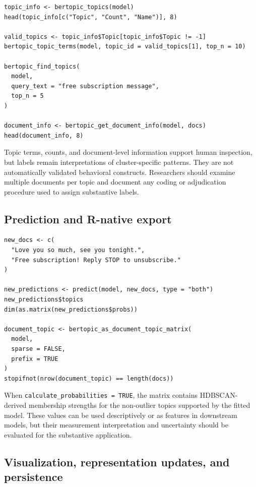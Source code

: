 \documentclass[12pt]{article}
\newcommand{\code}[1]{\texttt{#1}}
\begin{document}
\begin{lstlisting}[caption={Inspecting and querying the fitted topic solution.}]
topic_info <- bertopic_topics(model)
head(topic_info[c("Topic", "Count", "Name")], 8)

valid_topics <- topic_info$Topic[topic_info$Topic != -1]
bertopic_topic_terms(model, topic_id = valid_topics[1], top_n = 10)

bertopic_find_topics(
  model,
  query_text = "free subscription message",
  top_n = 5
)

document_info <- bertopic_get_document_info(model, docs)
head(document_info, 8)
\end{lstlisting}

Topic terms, counts, and document-level information support human inspection, but labels remain interpretations of cluster-specific patterns. They are not automatically validated behavioral constructs. Researchers should examine multiple documents per topic and document any coding or adjudication procedure used to assign substantive labels.

\subsection{Prediction and R-native export}

\begin{lstlisting}[caption={Transforming new documents and exporting training-corpus output.}]
new_docs <- c(
  "Love you so much, see you tonight.",
  "Free subscription! Reply STOP to unsubscribe."
)

new_predictions <- predict(model, new_docs, type = "both")
new_predictions$topics
dim(as.matrix(new_predictions$probs))

document_topic <- bertopic_as_document_topic_matrix(
  model,
  sparse = FALSE,
  prefix = TRUE
)
stopifnot(nrow(document_topic) == length(docs))
\end{lstlisting}

When \code{calculate\_probabilities = TRUE}, the matrix contains HDBSCAN-derived membership strengths for the non-outlier topics supported by the fitted model. These values can be used descriptively or as features in downstream models, but their measurement interpretation and uncertainty should be evaluated for the substantive application.

\subsection{Visualization, representation updates, and persistence}
\end{document}
